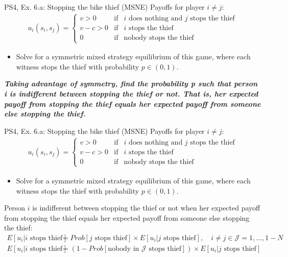 \begin{frame}{PS4, Ex. 6.a: Stopping the bike thief (MSNE)}
    Payoffs for player $i\neq j$:
    \begin{align*}
      u_i(s_i,s_j)=
      \left\{ \begin{array}{rcl}
      v > 0 & \mbox{if} & \mbox{$i$ does nothing and $j$ stops the thief} \\
      v-c>0 & \mbox{if} & \mbox{$i$ stops the thief} \\
      0     & \mbox{if} & \mbox{nobody stops the thief}
      \end{array}\right.
    \end{align*}
    \vspace{-12pt}
    \begin{itemize}
      \item[a)] Solve for a symmetric mixed strategy equilibrium of this game, where each witness stops the thief with probability $p\in(0,1)$.
    \end{itemize}
    \textbf{\textit{Taking advantage of symmetry, find the probability p such that person i is indifferent between stopping the thief or not. That is, her expected payoff from stopping the thief equals her expected payoff from someone else stopping the thief.}}
  \vfill\null
\end{frame}
\begin{frame}{PS4, Ex. 6.a: Stopping the bike thief (MSNE)}
    Payoffs for player $i\neq j$:
    \begin{align*}
      u_i(s_i,s_j)=
      \left\{ \begin{array}{rcl}
      v > 0 & \mbox{if} & \mbox{$i$ does nothing and $j$ stops the thief} \\
      v-c>0 & \mbox{if} & \mbox{$i$ stops the thief} \\
      0     & \mbox{if} & \mbox{nobody stops the thief}
      \end{array}\right.
    \end{align*}
    \vspace{-12pt}
    \begin{itemize}
      \item[a)] Solve for a symmetric mixed strategy equilibrium of this game, where each witness stops the thief with probability $p\in(0,1)$.
    \end{itemize}
    Person $i$ is indifferent between stopping the thief or not when her expected payoff from stopping the thief equals her expected payoff from someone else stopping the thief:
    \begin{align*}
        E[u_i|i\text{ stops thief}]&=Prob[j\text{ stops thief}]\times E[u_i|j\text{ stops thief}],\quad i\neq j\in \mathcal{J}=1,...,1-N\\
        E[u_i|i\text{ stops thief}]&=\left(1-Prob[\text{nobody in $\mathcal{J}$ stops thief}]\right)\times E[u_i|j\text{ stops thief}]
    \end{align*}
  \vfill\null
\end{frame}
